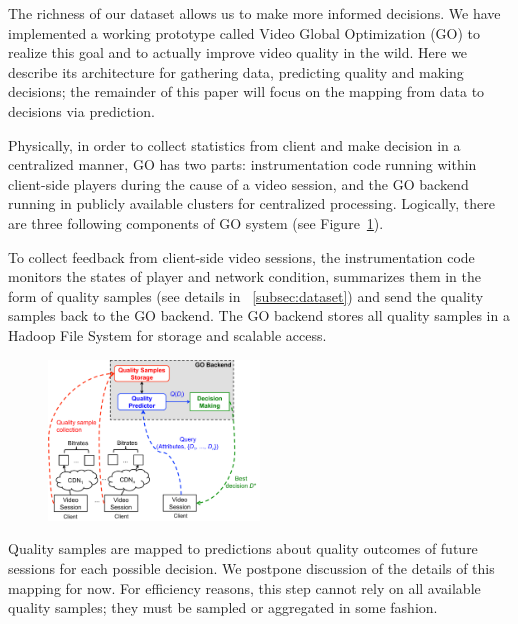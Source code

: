 \label{sec:overview}

 The richness of our dataset allows us to make more informed decisions. We have implemented a working prototype called Video Global Optimization (GO) to realize this goal and to actually improve video quality in the wild.  Here we describe its architecture for gathering data, predicting quality and making decisions; the remainder of this paper will focus on the mapping from data to decisions via prediction.

 Physically, in order to collect statistics from client and make decision in a centralized manner, GO has two parts: instrumentation code running within client-side players during the cause of a video session, and the GO backend running in publicly available clusters for centralized processing. Logically, there are three following components of GO system (see Figure~\ref{fig:go-overview}). 

 To collect feedback from client-side video sessions, the instrumentation code monitors the states of player and network condition, summarizes them in the form of quality samples (see details in \Section~\ref{subsec:dataset}) and send the quality samples back to the GO backend. The GO backend stores all quality samples in a Hadoop File System for storage and scalable access. 

\begin{figure}[h!]
\centering
 \includegraphics[width=0.5\textwidth] {figures/go-overview.pdf}
\label{fig:go-overview}
\end{figure}

 Quality samples are mapped to predictions about quality outcomes of future sessions for each possible decision.  We postpone discussion of the details of this mapping for now.  For efficiency reasons, this step cannot rely on all available quality samples; they must be sampled or aggregated in some fashion.

